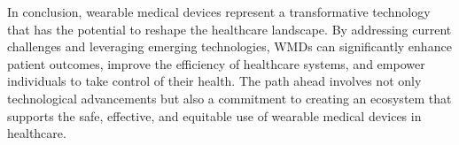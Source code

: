 \documentclass[journal]{IEEEtran}
\begin{document}
In conclusion, wearable medical devices represent a transformative technology that has the potential to reshape the healthcare landscape. By addressing current challenges and leveraging emerging technologies, WMDs can significantly enhance patient outcomes, improve the efficiency of healthcare systems, and empower individuals to take control of their health. The path ahead involves not only technological advancements but also a commitment to creating an ecosystem that supports the safe, effective, and equitable use of wearable medical devices in healthcare.















%





\end{document}
